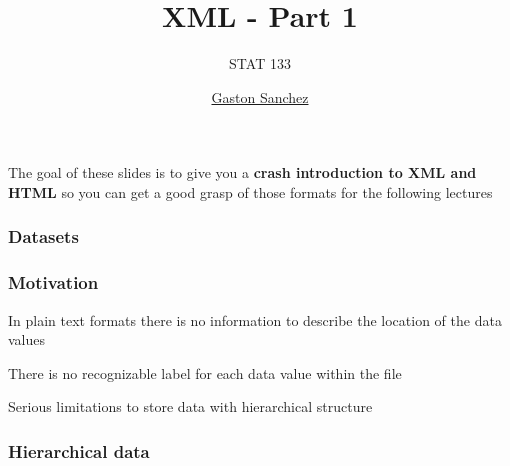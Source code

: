 \documentclass[12pt]{beamer}\usepackage[]{graphicx}\usepackage[]{color}
\title{XML - Part 1}
\subtitle{STAT 133}
\author{\href{http://www.gastonsanchez.com}{Gaston Sanchez}}
\institute{\href{https://github.com/ucb-stat133/stat133-fall-2016}{\tt \scriptsize \color{foreground} github.com/ucb-stat133/stat133-fall-2016}}
\date{}
\begin{document}
{
  \frame{
    \titlepage
  } 
}


\begin{frame}
\begin{center}
\Huge{}
\end{center}
\end{frame}


\begin{frame}
\begin{center}

The goal of these slides is to give you a \textbf{crash introduction to XML and HTML} so you can get a good grasp of those formats for the following lectures
\eb

\end{center}
\end{frame}


\begin{frame}
\frametitle{Datasets}

\eb
\begin{center}
\end{center}

\end{frame}


\begin{frame}
\frametitle{Motivation}

\bbi
  \item In plain text formats there is no information to describe the location of the data values
  \item There is no recognizable label for each data value within the file
  \item Serious limitations to store data with hierarchical structure 
\ei
\eb

\end{frame}


\begin{frame}
\frametitle{Hierarchical data}
\begin{center}
\end{center}
\end{frame}
\end{document}
